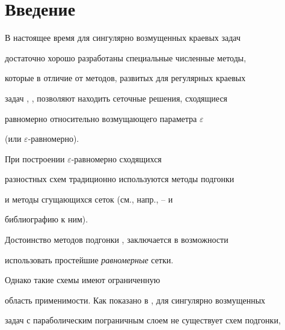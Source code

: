 \date{}




\pagestyle{plain} %







\maketitle


\label{begin}








\section{Введение}\label{section.1}





В настоящее время для сингулярно возмущенных краевых задач


достаточно хорошо разработаны специальные численные методы,


которые в отличие от методов, развитых для регулярных краевых


задач \cite{1}, \cite{2}, позволяют находить сеточные решения, сходящиеся


равномерно относительно возмущающего параметра $\varepsilon$


(или $\varepsilon$-равномерно).


При построении $\varepsilon$-равномерно сходящихся


разностных схем традиционно используются методы подгонки


и методы сгущающихся сеток (см., напр., \cite{3}--\cite{CRC} и


библиографию к ним).





Достоинство методов подгонки \cite{4}, \cite{5} заключается в возможности


использовать простейшие {\it равномерные} сетки.


Однако такие схемы имеют ограниченную


область применимости. Как показано в \cite{6}, для сингулярно возмущенных


задач с параболическим пограничным слоем не существует схем подгонки,


